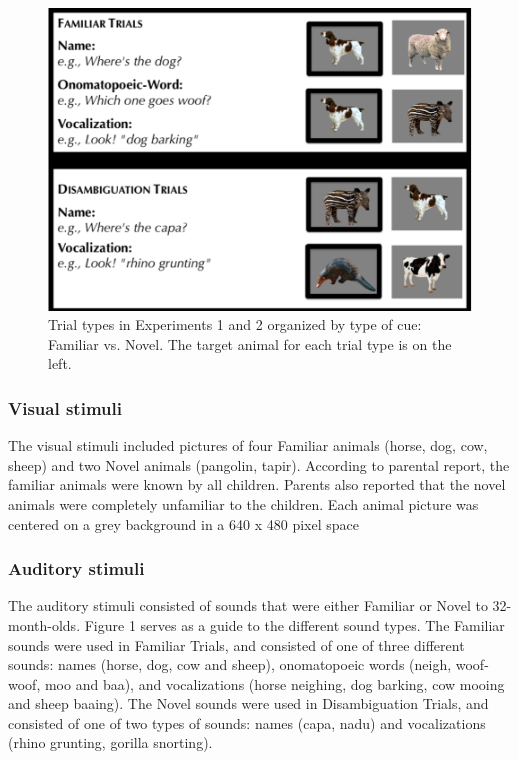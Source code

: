 \documentclass[english,floatsintext,man]{apa6}
\theoremstyle{definition}
\theoremstyle{definition}
\theoremstyle{definition}
\theoremstyle{remark}
\begin{document}
\begin{figure}[tb]
\includegraphics[width=0.95\linewidth]{anime_manuscript_files/figure-latex/stimuli-e1-1} \caption{Trial types in Experiments 1 and 2 organized by type of cue: Familiar vs. Novel. The target animal for each trial type is on the left.}\label{fig:stimuli-e1}
\end{figure}

\hypertarget{visual-stimuli}{%
\subsubsection{Visual stimuli}\label{visual-stimuli}}

The visual stimuli included pictures of four Familiar animals (horse,
dog, cow, sheep) and two Novel animals (pangolin, tapir). According to
parental report, the familiar animals were known by all children.
Parents also reported that the novel animals were completely unfamiliar
to the children. Each animal picture was centered on a grey background
in a 640 x 480 pixel space

\hypertarget{auditory-stimuli}{%
\subsubsection{Auditory stimuli}\label{auditory-stimuli}}

The auditory stimuli consisted of sounds that were either Familiar or
Novel to 32-month-olds. Figure 1 serves as a guide to the different
sound types. The Familiar sounds were used in Familiar Trials, and
consisted of one of three different sounds: names (horse, dog, cow and
sheep), onomatopoeic words (neigh, woof-woof, moo and baa), and
vocalizations (horse neighing, dog barking, cow mooing and sheep
baaing). The Novel sounds were used in Disambiguation Trials, and
consisted of one of two types of sounds: names (capa, nadu) and
vocalizations (rhino grunting, gorilla snorting).
\end{document}
